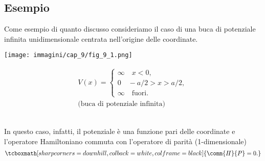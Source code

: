 \subsection*{Esempio}
Come esempio di quanto discusso consideriamo il caso di una buca di potenziale infinita unidimensionale centrata nell'origine delle coordinate.\\
\begin{minipage}{.4\textwidth}
\texttt{[image: immagini/cap\_9/fig\_9\_1.png]}	
\end{minipage}
\begin{minipage}{.55\textwidth}
\begin{align}
V(x)= 
\begin{cases}
\infty \quad x<0,\\
0 \quad -a/2>x>a/2, \\
\infty \quad \textrm{fuori}.
\end{cases}
\\
\textrm{(buca di potenziale infinita)} \nonumber
\end{align}
\end{minipage}\\[0.5cm]

In questo caso, infatti, il potenziale è una funzione pari delle coordinate e l'operatore Hamiltoniano commuta con l'operatore di parità (1-dimensionale)
	\begin{equation}
	\tcboxmath[sharp corners=downhill, colback=white, colframe=black]{
		\comm {H}{P}= 0 .
		}
	\end{equation}\\
	
